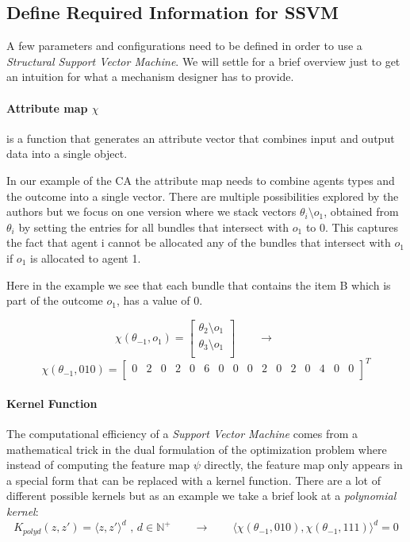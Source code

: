\documentclass[]{article}
\begin{document}
\subsection{Define Required Information for SSVM}

A few parameters and configurations need to be defined in order to use a \emph{Structural Support Vector Machine}. We will settle for a brief overview just to get an intuition for what a mechanism designer has to provide.

\paragraph{Attribute map $\chi$} is a function that generates an attribute vector that combines input and output data into a single object. 

\noindent In our example of the CA the attribute map needs to combine agents types and the outcome into a single vector. There are multiple possibilities explored by the authors but we focus on one version where we stack vectors $\theta_{i} \setminus o_{1}$, obtained from $\theta_{i}$ by setting the entries for all bundles that intersect with $o_{1}$ to 0. This captures the fact that agent i cannot be allocated any of the bundles that intersect with $o_{1}$ if $o_{1}$ is allocated to agent 1.
 
\noindent Here in the example we see that each bundle that contains the item B which is part of the outcome $o_{1}$, has a value of 0.

\setcounter{MaxMatrixCols}{16}
\begin{equation*}
\chi(\theta_{-1}, o_{1})=\begin{bmatrix}
\theta_{2} \setminus  o_{1} \\
\theta_{3} \setminus  o_{1}  \\
\end{bmatrix} \qquad\rightarrow\qquad
\end{equation*}
\begin{equation*}
\chi(\theta_{-1}, 010)=\begin{bmatrix}
0 & 2 & 0 & 2 & 0 & 6 & 0 & 0 & 0 & 2 & 0 & 2 & 0 & 4 & 0 & 0\\
\end{bmatrix} ^{T}
\end{equation*}

\paragraph{Kernel Function} The computational efficiency of a \emph{Support Vector Machine} comes from a mathematical trick in the dual formulation of the optimization problem where instead of computing the feature map $\psi$ directly, the feature map only appears in a special form that can be replaced with a kernel function.
There are a lot of different possible kernels but as an example we take a brief look at a \emph{polynomial kernel}:
\begin{equation*}
K_{polyd}(z, z') = \langle z , z' \rangle^{d}\text{ , } d \in \mathbb{N}^{+} \qquad\rightarrow\qquad  \langle \chi(\theta_{-1}, 010), \chi(\theta_{-1}, 111) \rangle^{d} = 0
\end{equation*}
\end{document}
